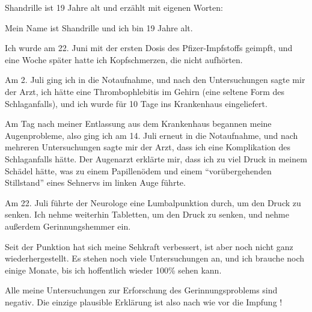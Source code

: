 Shandrille ist 19 Jahre alt und erzählt mit eigenen Worten:

Mein Name ist Shandrille und ich bin 19 Jahre alt.

Ich wurde am 22. Juni mit der ersten Dosis des Pfizer-Impfstoffs geimpft, und
eine Woche später hatte ich Kopfschmerzen, die nicht aufhörten.

Am 2. Juli ging ich in die Notaufnahme, und nach den Untersuchungen sagte mir
der Arzt, ich hätte eine Thrombophlebitis im Gehirn (eine seltene Form des
Schlaganfalls), und ich wurde für 10 Tage ins Krankenhaus eingeliefert.

Am Tag nach meiner Entlassung aus dem Krankenhaus begannen meine Augenprobleme,
also ging ich am 14. Juli erneut in die Notaufnahme, und nach mehreren
Untersuchungen sagte mir der Arzt, dass ich eine Komplikation des Schlaganfalls
hätte. Der Augenarzt erklärte mir, dass ich zu viel Druck in meinem Schädel
hätte, was zu einem Papillenödem und einem ``vorübergehenden Stillstand''
eines Sehnervs im linken Auge führte.

Am 22. Juli führte der Neurologe eine Lumbalpunktion durch, um den Druck zu
senken. Ich nehme weiterhin Tabletten, um den Druck zu senken, und nehme
außerdem Gerinnungshemmer ein.

Seit der Punktion hat sich meine Sehkraft verbessert, ist aber noch nicht ganz
wiederhergestellt. Es stehen noch viele Untersuchungen an, und ich brauche noch
einige Monate, bis ich hoffentlich wieder 100\% sehen kann.

Alle meine Untersuchungen zur Erforschung des Gerinnungsproblems sind
negativ. Die einzige plausible Erklärung ist also nach wie vor die Impfung !
